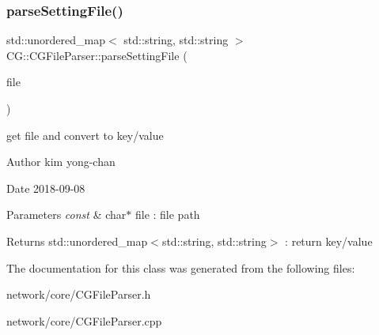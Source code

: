 \subsubsection{\texorpdfstring{parse\+Setting\+File()}{parseSettingFile()}}
{\footnotesize\ttfamily std\+::unordered\+\_\+map$<$ std\+::string, std\+::string $>$ C\+G\+::\+C\+G\+File\+Parser\+::parse\+Setting\+File (\begin{DoxyParamCaption}\item[{const char $\ast$}]{file }\end{DoxyParamCaption})}



get file and convert to key/value 

\begin{DoxyAuthor}{Author}
kim yong-\/chan 
\end{DoxyAuthor}
\begin{DoxyDate}{Date}
2018-\/09-\/08 
\end{DoxyDate}

\begin{DoxyParams}{Parameters}
{\em const} & char$\ast$ file \+: file path \\
\hline
\end{DoxyParams}
\begin{DoxyReturn}{Returns}
std\+::unordered\+\_\+map$<$std\+::string, std\+::string$>$ \+: return key/value 
\end{DoxyReturn}


The documentation for this class was generated from the following files\+:\begin{DoxyCompactItemize}
\item 
network/core/C\+G\+File\+Parser.\+h\item 
network/core/C\+G\+File\+Parser.\+cpp\end{DoxyCompactItemize}

